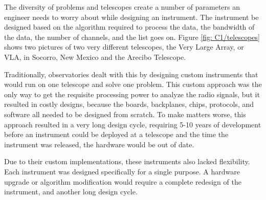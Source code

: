 The diversity of problems and telescopes create a number of parameters an engineer needs to worry about while designing an instrument.
The instrument be designed based on the algorithm required to process the data, the bandwidth of the data, the number of channels, and the list goes on.
Figure \ref{fig: C1/telescopes} shows two pictures of two very different telescopes, the Very Large Array, or VLA,  in Socorro, New Mexico and the Arecibo Telescope.

Traditionally, observatories dealt with this by designing custom instruments that would run on one telescope and solve one problem.
This custom approach was the only way to get the requisite processing power to analyze the radio signals, but it resulted in costly designs, because the boards, backplanes, chips, protocols, and software all needed to be designed from scratch.
To make matters worse, this approach resulted in a very long design cycle,  requiring 5-10 years of development before an instrument could be deployed at a telescope and the time the instrument was released, the hardware would be out of date.

Due to their custom implementations, these instruments also lacked flexibility. 
Each instrument was designed specifically for a single purpose.
A hardware upgrade or algorithm modification would require a complete redesign of the instrument, and another long design cycle.





